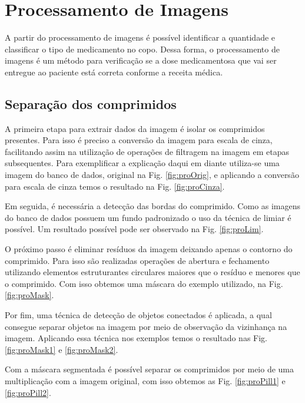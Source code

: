 \section{Processamento de Imagens}

A partir do  processamento de imagens é possível identificar a quantidade e classificar o tipo de medicamento no copo. Dessa forma, o processamento de imagens é um método para verificação se a dose medicamentosa que vai ser entregue ao paciente está correta conforme a receita médica.

\subsection{Separação dos comprimidos}

A primeira etapa para extrair dados da imagem é isolar os comprimidos presentes. Para isso é preciso a conversão da imagem para escala de cinza, facilitando assim na utilização de operações de filtragem na imagem em etapas subsequentes. Para exemplificar a explicação daqui em diante utiliza-se uma imagem do banco de dados, original na Fig. \ref{fig:proOrig}, e aplicando a conversão para escala de cinza temos o resultado na Fig. \ref{fig:proCinza}.

Em seguida, é necessária a detecção das bordas do comprimido. Como as imagens do banco de dados possuem um fundo padronizado o uso da técnica de limiar é possível. Um resultado possível pode ser observado na Fig. \ref{fig:proLim}. 

O próximo passo é eliminar resíduos da imagem deixando apenas o contorno do comprimido. Para isso são realizadas operações de abertura e fechamento utilizando elementos estruturantes circulares maiores que o resíduo e menores que o comprimido. Com isso obtemos uma máscara do exemplo utilizado, na Fig. \ref{fig:proMask}.

Por fim, uma técnica de detecção de objetos conectados é aplicada, a qual consegue separar objetos na imagem por meio de observação da vizinhança na imagem. Aplicando essa técnica nos exemplos temos o resultado nas Fig. \ref{fig:proMask1} e \ref{fig:proMask2}.

Com a máscara segmentada é possível separar os comprimidos por meio de uma multiplicação com a imagem original, com isso obtemos as Fig. \ref{fig:proPill1} e \ref{fig:proPill2}.

